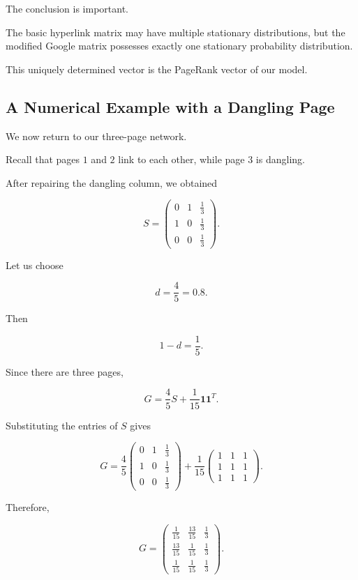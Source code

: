 \documentclass[11pt,a4paper]{article}
\theoremstyle{definition}
\theoremstyle{remark}
\begin{document}
The conclusion is important.

The basic hyperlink matrix
may have multiple
stationary distributions,
but the modified Google
matrix possesses exactly
one stationary probability
distribution.

This uniquely determined
vector is the PageRank
vector of our model.


\subsection{A Numerical Example
with a Dangling Page}

We now return to
our three-page network.

Recall that pages $1$
and $2$ link to
each other, while
page $3$ is dangling.

After repairing the
dangling column,
we obtained

\[
S=
\begin{pmatrix}
0&1&\frac13\\
1&0&\frac13\\
0&0&\frac13
\end{pmatrix}.
\]

Let us choose

\[
d=\frac45=0.8.
\]

Then

\[
1-d=\frac15.
\]

Since there are
three pages,

\[
G=
\frac45 S
+
\frac1{15}
\mathbf{1}\mathbf{1}^T.
\]

Substituting the
entries of $S$ gives

\[
G=
\frac45
\begin{pmatrix}
0&1&\frac13\\
1&0&\frac13\\
0&0&\frac13
\end{pmatrix}
+
\frac1{15}
\begin{pmatrix}
1&1&1\\
1&1&1\\
1&1&1
\end{pmatrix}.
\]

Therefore,

\begin{equation}
\boxed{
G=
\begin{pmatrix}
\frac1{15}&\frac{13}{15}&\frac13\\[1mm]
\frac{13}{15}&\frac1{15}&\frac13\\[1mm]
\frac1{15}&\frac1{15}&\frac13
\end{pmatrix}.
}
\label{eq:google_three_page_example}
\end{equation}
\end{document}
